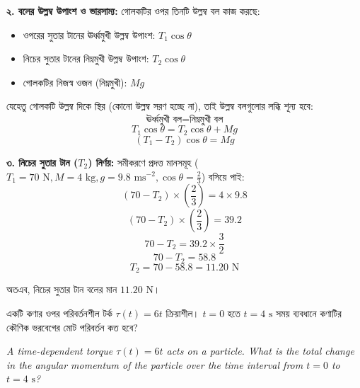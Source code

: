 \documentclass[12pt, a4paper]{article}
\begin{document}
{\begin{tcolorbox}[solutionbox={সমাধান (Solution)}]
\vspace{0.5em}
\textbf{২. বলের উল্লম্ব উপাংশ ও ভারসাম্য:}
গোলকটির ওপর তিনটি উল্লম্ব বল কাজ করছে:
\begin{itemize}[leftmargin=1.5em, itemsep=0.2em]
    \item ওপরের সুতার টানের ঊর্ধ্বমুখী উল্লম্ব উপাংশ: $T_1 \cos\theta$
    \item নিচের সুতার টানের নিম্নমুখী উল্লম্ব উপাংশ: $T_2 \cos\theta$
    \item গোলকটির নিজস্ব ওজন (নিম্নমুখী): $Mg$
\end{itemize}
যেহেতু গোলকটি উল্লম্ব দিকে স্থির (কোনো উল্লম্ব সরণ হচ্ছে না), তাই উল্লম্ব বলগুলোর লব্ধি শূন্য হবে:
$$\text{ঊর্ধ্বমুখী বল} = \text{নিম্নমুখী বল}$$
$$T_1 \cos\theta = T_2 \cos\theta + Mg$$
$$(T_1 - T_2) \cos\theta = Mg$$

\vspace{0.5em}
\textbf{৩. নিচের সুতার টান ($T_2$) নির্ণয়:}
সমীকরণে প্রদত্ত মানসমূহ ($T_1 = 70\text{ N}, M = 4\text{ kg}, g = 9.8\text{ ms}^{-2}, \cos\theta = \frac{2}{3}$) বসিয়ে পাই:
$$(70 - T_2) \times \left(\frac{2}{3}\right) = 4 \times 9.8$$
$$(70 - T_2) \times \left(\frac{2}{3}\right) = 39.2$$
$$70 - T_2 = 39.2 \times \frac{3}{2}$$
$$70 - T_2 = 58.8$$
$$T_2 = 70 - 58.8 = 11.20\text{ N}$$

অতএব, নিচের সুতার টান বলের মান $11.20\text{ N}$।
\end{tcolorbox}
\vspace{1em}
\begin{tcolorbox}[questionbox={প্রশ্ন (Question) 25}]
\noindent
একটি কণার ওপর পরিবর্তনশীল টর্ক $\tau(t) = 6t$ ক্রিয়াশীল। $t = 0$ হতে $t = 4\text{ s}$ সময় ব্যবধানে কণাটির কৌণিক ভরবেগের মোট পরিবর্তন কত হবে?

\vspace{0.8em}
\begin{english}
\noindent\textit{\color{darkgray}
A time-dependent torque $\tau(t) = 6t$ acts on a particle. What is the total change in the angular momentum of the particle over the time interval from $t = 0$ to $t = 4\text{ s}$?
}
\end{english}
\end{tcolorbox}

\vspace{1em}
\begin{center}
\end{center}}
\end{document}
